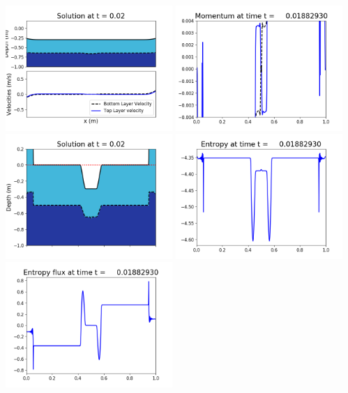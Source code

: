 \documentclass[11pt]{article}
\begin{document}
\includegraphics[width=0.475\textwidth]{frame0044fig1002.png}
\vskip 10pt 
\includegraphics[width=0.475\textwidth]{frame0044fig1003.png}
\includegraphics[width=0.475\textwidth]{frame0044fig1006.png}
\vskip 10pt 
\includegraphics[width=0.475\textwidth]{frame0044fig1007.png}
\includegraphics[width=0.475\textwidth]{frame0044fig1008.png}
\end{document}
